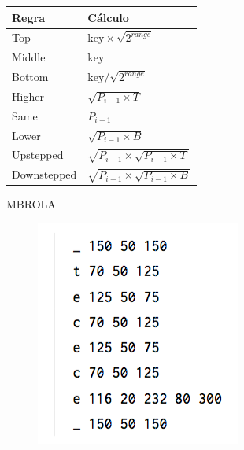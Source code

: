 \documentclass{beamer}
\begin{document}
\begin{frame}
\begin{table}[htb]
	\center
	{
		\begin{tabular}{l|l}
			\hline
			Regra       & Cálculo \\
			\hline
            Top         & $ \text{key} \times \sqrt{2^{range}} $ \\
            Middle      & $ \text{key} $ \\
            Bottom      & $ \text{key} / \sqrt{2^{range}} $ \\
			\hline
            Higher      & $ \sqrt{P_{i - 1} \times T} $ \\
            Same        & $ P_{i - 1} $ \\
            Lower       & $ \sqrt{P_{i - 1} \times B} $ \\
			\hline
            Upstepped   & $ \sqrt{P_{i - 1} \times  \sqrt{P_{i - 1} \times  T}} $ \\
            Downstepped & $ \sqrt{P_{i - 1} \times  \sqrt{P_{i - 1} \times  B}} $ \\
			\hline
		\end{tabular}
	}
	\label{tab:intsint}
\end{table}
\end{frame}

\begin{frame}{MBROLA}
  \begin{figure}
    \includegraphics[scale=0.60]{mbrola.png}
  \end{figure}
\end{frame}
\end{document}
